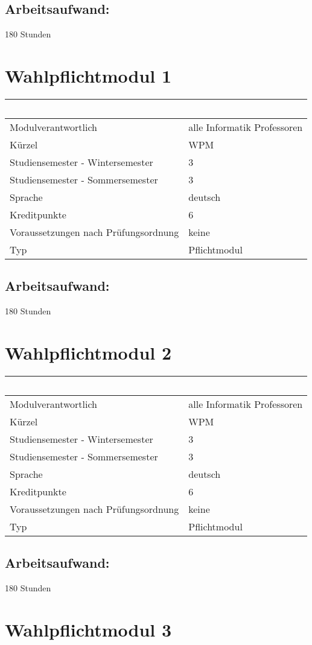 \section*{Arbeitsaufwand:}\label{arbeitsaufwand-5}

180 Stunden

\chapter{Wahlpflichtmodul 1}\label{wahlpflichtmodul-1}

\begin{longtable}[]{@{}ll@{}}
\toprule
~ & ~\tabularnewline
\midrule
\endhead
Modulverantwortlich & alle Informatik Professoren\tabularnewline
Kürzel & WPM\tabularnewline
Studiensemester - Wintersemester & 3\tabularnewline
Studiensemester - Sommersemester & 3\tabularnewline
Sprache & deutsch\tabularnewline
Kreditpunkte & 6\tabularnewline
Voraussetzungen nach Prüfungsordnung & keine\tabularnewline
Typ & Pflichtmodul\tabularnewline
\bottomrule
\end{longtable}

\section*{Arbeitsaufwand:}\label{arbeitsaufwand-6}

180 Stunden

\chapter{Wahlpflichtmodul 2}\label{wahlpflichtmodul-2}

\begin{longtable}[]{@{}ll@{}}
\toprule
~ & ~\tabularnewline
\midrule
\endhead
Modulverantwortlich & alle Informatik Professoren\tabularnewline
Kürzel & WPM\tabularnewline
Studiensemester - Wintersemester & 3\tabularnewline
Studiensemester - Sommersemester & 3\tabularnewline
Sprache & deutsch\tabularnewline
Kreditpunkte & 6\tabularnewline
Voraussetzungen nach Prüfungsordnung & keine\tabularnewline
Typ & Pflichtmodul\tabularnewline
\bottomrule
\end{longtable}

\section*{Arbeitsaufwand:}\label{arbeitsaufwand-7}

180 Stunden

\chapter{Wahlpflichtmodul 3}\label{wahlpflichtmodul-3}

